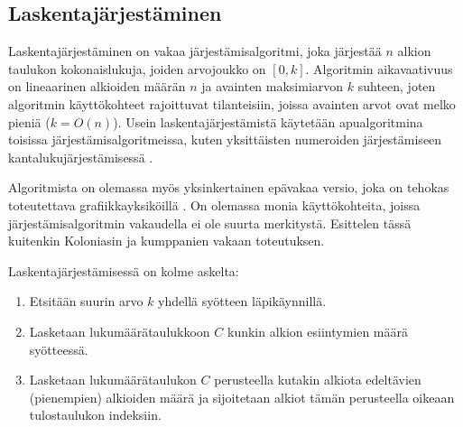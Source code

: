 \documentclass[a4paper,11pt]{article}
\begin{document}
\subsection{Laskentajärjestäminen}

Laskentajärjestäminen on vakaa järjestämisalgoritmi, joka järjestää $n$ alkion taulukon kokonaislukuja, joiden arvojoukko on $[0, k]$. Algoritmin aikavaativuus on lineaarinen alkioiden määrän $n$ ja avainten maksimiarvon $k$ suhteen, joten algoritmin käyttökohteet rajoittuvat tilanteisiin, joissa avainten arvot ovat melko pieniä ($k = O(n)$). Usein laskentajärjestämistä käytetään apualgoritmina toisissa järjestämisalgoritmeissa, kuten yksittäisten numeroiden järjestämiseen kantalukujärjestämisessä \cite{clrs}.

Algoritmista on olemassa myös yksinkertainen epävakaa versio, joka on tehokas toteutettava grafiikkayksiköillä \cite{sun2009}. On olemassa monia käyttökohteita, joissa järjestämisalgoritmin vakaudella ei ole suurta merkitystä. Esittelen tässä kuitenkin Koloniasin ja kumppanien \cite{kolonias2011} vakaan toteutuksen.

Laskentajärjestämisessä on kolme askelta:

\begin{enumerate}
\item Etsitään suurin arvo $k$ yhdellä syötteen läpikäynnillä.
\item Lasketaan lukumäärätaulukkoon $C$ kunkin alkion esiintymien määrä syötteessä.
\item Lasketaan lukumäärätaulukon $C$ perusteella kutakin alkiota edeltävien (pienempien) alkioiden määrä ja sijoitetaan alkiot tämän perusteella oikeaan tulostaulukon indeksiin.
\end{enumerate}

%
%
%
%
\end{document}
